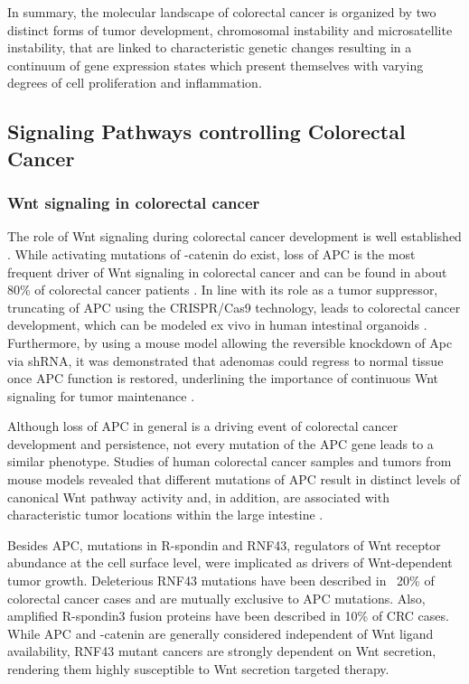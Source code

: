 \begin{flushleft}
In summary, the molecular landscape of colorectal cancer is organized by two distinct forms of tumor development, chromosomal instability and microsatellite instability, that are linked to characteristic genetic changes resulting in a continuum of gene expression states which present themselves with varying degrees of cell proliferation and inflammation. \par

\subsection{Signaling Pathways controlling Colorectal Cancer}
\subsubsection{Wnt signaling in colorectal cancer}
The role of Wnt signaling during colorectal cancer development is well established \cite{Polakis2007}. While activating mutations of \textbeta-catenin do exist, loss of APC is the most frequent driver of Wnt signaling in colorectal cancer and can be found in about 80\% of colorectal cancer patients \cite{Fearon1989}. In line with its role as a tumor suppressor, truncating of APC using the CRISPR/Cas9 technology, leads to colorectal cancer development, which can be modeled ex vivo in human intestinal organoids \cite{Matano2015, Drost2015SequentialCells}. Furthermore, by using a mouse model allowing the reversible knockdown of Apc via shRNA, it was demonstrated that adenomas could regress to normal tissue once APC function is restored, underlining the importance of continuous Wnt signaling for tumor maintenance \cite{Dow2015}. \par
Although loss of APC in general is a driving event of colorectal cancer development and persistence, not every mutation of the APC gene leads to a similar phenotype. Studies of human colorectal cancer samples and tumors from mouse models revealed that different mutations of APC result in distinct levels of canonical Wnt pathway activity and, in addition, are associated with characteristic tumor locations within the large intestine \cite{Christie2013, Buchert2010}. \par

Besides APC, mutations in R-spondin and RNF43, regulators of Wnt receptor abundance at the cell surface level, 
were implicated as drivers of Wnt-dependent tumor growth. Deleterious RNF43 mutations have been described in ~20\% of colorectal cancer cases and are mutually exclusive to APC mutations. Also, amplified R-spondin3 fusion proteins have been described in 10\% of CRC cases. While APC and \textbeta-catenin are generally considered independent of Wnt ligand availability, RNF43 mutant cancers are strongly dependent on Wnt secretion, rendering them highly susceptible to Wnt secretion targeted therapy.


\end{flushleft}
